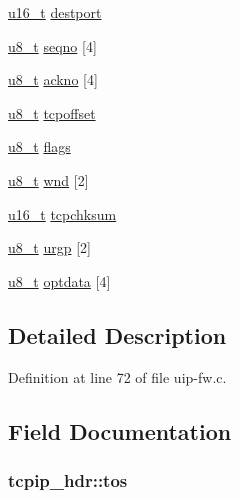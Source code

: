 \begin{DoxyCompactItemize}
\item 
\hyperlink{group__uipfw_ga77570ac4fcab86864fa1916e55676da2}{u16\_\-t} \hyperlink{group__uipfw_ga9824b382c2e5c3a39229c3c126700b42}{destport}
\item 
\hyperlink{group__uipfw_ga4caecabca98b43919dd11be1c0d4cd8e}{u8\_\-t} \hyperlink{group__uipfw_gadb7d3ca80f0f4415f7d5f680c600904c}{seqno} \mbox{[}4\mbox{]}
\item 
\hyperlink{group__uipfw_ga4caecabca98b43919dd11be1c0d4cd8e}{u8\_\-t} \hyperlink{group__uipfw_gad59c3ee7e63ca52c5bf927c22e89810f}{ackno} \mbox{[}4\mbox{]}
\item 
\hyperlink{group__uipfw_ga4caecabca98b43919dd11be1c0d4cd8e}{u8\_\-t} \hyperlink{group__uipfw_gaec07fa9add3c0a172516e0ec66810ac4}{tcpoffset}
\item 
\hyperlink{group__uipfw_ga4caecabca98b43919dd11be1c0d4cd8e}{u8\_\-t} \hyperlink{group__uipfw_ga5699a8989a6d01adf59c4984cae06a67}{flags}
\item 
\hyperlink{group__uipfw_ga4caecabca98b43919dd11be1c0d4cd8e}{u8\_\-t} \hyperlink{group__uipfw_ga8da4793ac511e68c37ad2dcfd37c639b}{wnd} \mbox{[}2\mbox{]}
\item 
\hyperlink{group__uipfw_ga77570ac4fcab86864fa1916e55676da2}{u16\_\-t} \hyperlink{group__uipfw_ga711271ced4443aa908b161ccde1a9de4}{tcpchksum}
\item 
\hyperlink{group__uipfw_ga4caecabca98b43919dd11be1c0d4cd8e}{u8\_\-t} \hyperlink{group__uipfw_gadee52ce29db507d7d12185a0e9388b51}{urgp} \mbox{[}2\mbox{]}
\item 
\hyperlink{group__uipfw_ga4caecabca98b43919dd11be1c0d4cd8e}{u8\_\-t} \hyperlink{group__uipfw_ga1db8d3a6459a09cd08315c3d131ac982}{optdata} \mbox{[}4\mbox{]}
\end{DoxyCompactItemize}


\subsection{Detailed Description}


Definition at line 72 of file uip-\/fw.c.



\subsection{Field Documentation}
\hypertarget{structtcpip__hdr_a37562b2acca6ce3fb04923755968ae0c}{
\subsubsection[{tos}]{ {\bf tcpip\_\-hdr::tos}}}
\label{structtcpip__hdr_a37562b2acca6ce3fb04923755968ae0c}



